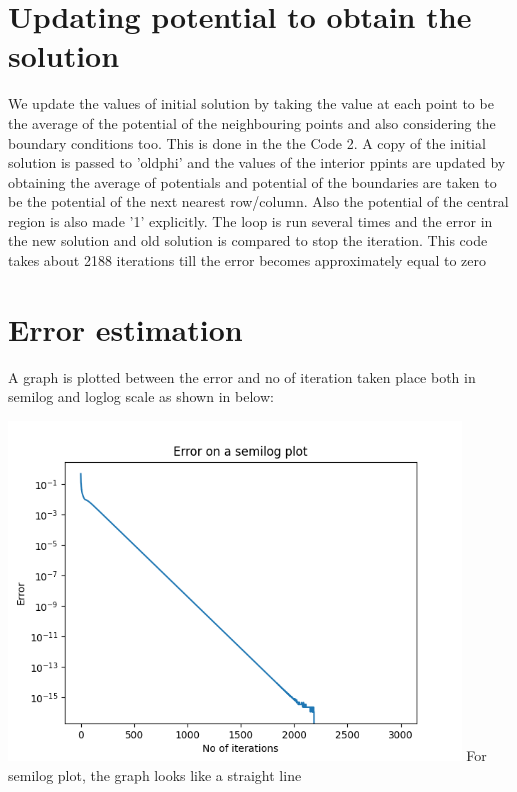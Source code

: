 \documentclass[10pt,a4paper]{article}
\begin{document}
\section{Updating potential to obtain the solution}
We update the values of initial solution by taking the value at each point to be the average of the potential of the neighbouring points and also considering the boundary conditions too. This is done in the the Code 2. A copy of the initial solution is passed to 'oldphi' and the values of the interior ppints are updated by obtaining the average of potentials and potential of the boundaries are taken to be the potential of the next nearest row/column. Also the potential of the central region is also made '1' explicitly. The loop is run several times and the error in the new solution and old solution is compared to stop the iteration. This code takes about 2188 iterations till the error becomes approximately equal to zero

\section{Error estimation}
A graph is plotted between the error and no of iteration taken place both in semilog and loglog scale as shown in below:

\includegraphics[width = 0.9\textwidth]{2.png}
\newline
For semilog plot, the graph looks like a straight line
\end{document}
